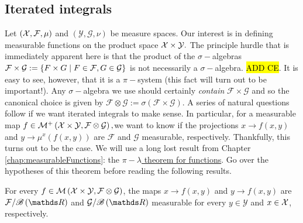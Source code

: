 \subsection{Iterated integrals}

Let $\left(\mathcal{X},\mathcal{F},\mu\right)$ and $\left(\mathcal{Y},\mathcal{G},\nu\right)$
be measure spaces. Our interest is in defining measurable functions
on the product space $\mathcal{X}\times\mathcal{Y}.$ The principle hurdle
that is immediately apparent here is that the product of the $\sigma-$algebras
$\mathcal{F}\times\mathcal{G}:=\left\{ F\times G\mid F\in\mathcal{F},G\in\mathcal{G}\right\} $
is not necessarily a $\sigma-$algebra. \hl{ADD CE}. It is easy to
see, however, that it is a $\pi-$system (this fact will turn out
to be important!). Any $\sigma-$algebra we use should certainly \emph{contain
}$\mathcal{F}\times\mathcal{G}$ and so the canonical choice is given
by $\mathcal{F}\otimes\mathcal{G:=\sigma\left(F\times G\right)}$.
A series of natural questions follow if we want iterated integrals
to make sense. In particular, for a measurable map $f\in\mathcal{M}^{+}\left(\mathcal{X}\times\mathcal{Y},\mathcal{F}\otimes\mathcal{G}\right),$we
want to know if the projections $x\to f(x,y)$ and $y\to\mu^{x}\left(f\left(x,y\right)\right)$
are $\mathcal{F}$ and $\mathcal{G}$ measurable, respectively. Thankfully,
this turns out to be the case. We will use a long lost result from
Chapter \ref{chap:measurableFunctions}: the \hyperref[thm:piLambdaThmFunctions]{$\pi-\lambda$ theorem for functions}.
Go over the hypotheses of this theorem before reading the following
results.
\begin{lem}
\label{lem:partialFunctionMeasurability}For every $f\in\mathcal{M}\left(\mathcal{X}\times\mathcal{Y},\mathcal{F}\otimes\mathcal{G}\right)$,
the maps $x\to f(x,y)$ and $y\to f(x,y)$ are $\mathcal{F}/\borel\left(\R\right)$
and $\mathcal{G}/\borel\left(\R\right)$ measurable for every $y\in\mathcal{Y}$
and $x\in\mathcal{X}$, respectively.
\end{lem}

